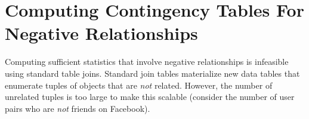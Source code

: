 \documentclass{vldb}
\begin{document}
\section{Computing Contingency Tables For Negative Relationships} 
Computing sufficient statistics that involve negative relationships is infeasible using standard table joins. 
%
Standard join tables materialize new data tables that enumerate tuples of objects that are {\em not} related. %
However, the number of unrelated tuples is too large to make this scalable (consider the number of user pairs who are {\em not} friends on Facebook). 
\end{document}
